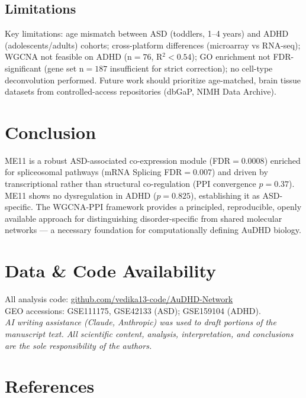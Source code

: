 \documentclass[10pt,twocolumn]{article}
\begin{document}
\subsection{Limitations}

Key limitations: age mismatch between ASD (toddlers, 1--4 years) and ADHD
(adolescents/adults) cohorts; cross-platform differences (microarray vs RNA-seq);
WGCNA not feasible on ADHD (n$=76$, R$^2<0.54$); GO enrichment not FDR-significant
(gene set n$=187$ insufficient for strict correction); no cell-type deconvolution
performed. Future work should prioritize age-matched, brain tissue datasets from
controlled-access repositories (dbGaP, NIMH Data Archive).

\section{Conclusion}

ME11 is a robust ASD-associated co-expression module (FDR$=0.0008$) enriched for
spliceosomal pathways (mRNA Splicing FDR$=0.007$) and driven by transcriptional rather
than structural co-regulation (PPI convergence $p=0.37$). ME11 shows no dysregulation
in ADHD ($p=0.825$), establishing it as ASD-specific. The WGCNA-PPI framework
provides a principled, reproducible, openly available approach for distinguishing
disorder-specific from shared molecular networks --- a necessary foundation for
computationally defining AuDHD biology.

\section*{Data \& Code Availability}

All analysis code: \url{github.com/vedika13-code/AuDHD-Network}\\
GEO accessions: GSE111175, GSE42133 (ASD); GSE159104 (ADHD).\\
\textit{AI writing assistance (Claude, Anthropic) was used to draft portions of the
manuscript text. All scientific content, analysis, interpretation, and conclusions are
the sole responsibility of the authors.}

\section*{References}

\end{document}
